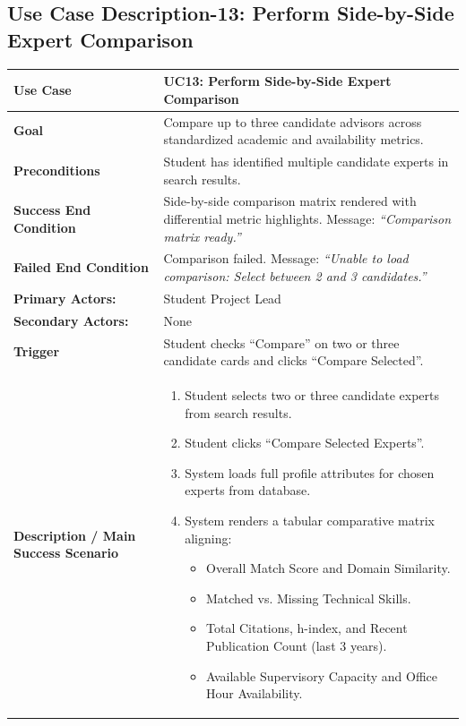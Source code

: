 \clearpage
\subsection{Use Case Description-13: Perform Side-by-Side Expert Comparison}
\label{subsec:uc13}

\begin{table}[H]
\centering
\small
\begin{tabularx}{\textwidth}{|l|X|}
\hline
\rowcolor{lightgray!40} \textbf{Use Case} & \textbf{UC13: Perform Side-by-Side Expert Comparison} \\ \hline
\textbf{Goal} & Compare up to three candidate advisors across standardized academic and availability metrics. \\ \hline
\textbf{Preconditions} & Student has identified multiple candidate experts in search results. \\ \hline
\textbf{Success End Condition} & Side-by-side comparison matrix rendered with differential metric highlights. Message: \textit{``Comparison matrix ready.''} \\ \hline
\textbf{Failed End Condition} & Comparison failed. Message: \textit{``Unable to load comparison: Select between 2 and 3 candidates.''} \\ \hline
\textbf{Primary Actors:} & Student Project Lead \\
\textbf{Secondary Actors:} & None \\ \hline
\textbf{Trigger} & Student checks ``Compare'' on two or three candidate cards and clicks ``Compare Selected''. \\ \hline
\textbf{Description / Main Success Scenario} &
\begin{enumerate}[leftmargin=*]
    \item Student selects two or three candidate experts from search results.
    \item Student clicks ``Compare Selected Experts''.
    \item System loads full profile attributes for chosen experts from database.
    \item System renders a tabular comparative matrix aligning:
    \begin{itemize}[leftmargin=*]
        \item Overall Match Score and Domain Similarity.
        \item Matched vs. Missing Technical Skills.
        \item Total Citations, h-index, and Recent Publication Count (last 3 years).
        \item Available Supervisory Capacity and Office Hour Availability.

\end{itemize}
\end{enumerate}
\end{tabularx}
\end{table}
